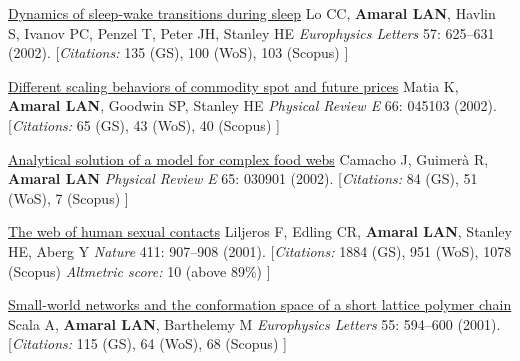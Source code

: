 \NumberedItem{\makebox[0.8cm][r]{[41]}}
\href{/people/amaral/dynamics-of-sleep-wake-transitions-during-sleep}
{Dynamics of sleep-wake transitions during sleep}
\newline
Lo CC, {\textbf{Amaral LAN}}, Havlin S, Ivanov PC, Penzel T, Peter JH, Stanley HE
\newline
\textit{Europhysics Letters}
    57:
625--631 (2002).
    \newline
    \hfill [{\em{Citations:}} 135 (GS),
    100 (WoS), 103 (Scopus)
    ]
\newline
\Gap
~
\Gap

\NumberedItem{\makebox[0.8cm][r]{[40]}}
\href{/people/amaral/different-scaling-behaviors-of-commodity-spot-and-future-prices}
{Different scaling behaviors of commodity spot and future prices}
\newline
Matia K, {\textbf{Amaral LAN}}, Goodwin SP, Stanley HE
\newline
\textit{Physical Review E}
    66:
045103 (2002).
    \newline
    \hfill [{\em{Citations:}} 65 (GS),
    43 (WoS), 40 (Scopus)
    ]
\newline
\Gap
~
\Gap

\NumberedItem{\makebox[0.8cm][r]{[39]}}
\href{/people/amaral/analytical-solution-of-a-model-for-complex-food-webs}
{Analytical solution of a model for complex food webs}
\newline
Camacho J, Guimer\`a R, {\textbf{Amaral LAN}}
\newline
\textit{Physical Review E}
    65:
030901 (2002).
    \newline
    \hfill [{\em{Citations:}} 84 (GS),
    51 (WoS), 7 (Scopus)
    ]
\newline
\Gap
~
\Gap

\NumberedItem{\makebox[0.8cm][r]{[38]}}
\href{/people/amaral/the-web-of-human-sexual-contacts}
{The web of human sexual contacts}
\newline
Liljeros F, Edling CR, {\textbf{Amaral LAN}}, Stanley HE, Aberg Y
\newline
\textit{Nature}
    411:
907--908 (2001).
    \newline
    \hfill [{\em{Citations:}} 1884 (GS),
    951 (WoS), 1078 (Scopus)
        {\hspace*{1cm} \em{Altmetric score:}}  10 (above 89\%)
    ]
\newline
\Gap
~
\Gap

\NumberedItem{\makebox[0.8cm][r]{[37]}}
\href{/people/amaral/small-world-networks-and-the-conformation-space-of-a-short-lattice-polymer-chain}
{Small-world networks and the conformation space of a short lattice polymer chain}
\newline
Scala A, {\textbf{Amaral LAN}}, Barthelemy M
\newline
\textit{Europhysics Letters}
    55:
594--600 (2001).
    \newline
    \hfill [{\em{Citations:}} 115 (GS),
    64 (WoS), 68 (Scopus)
    ]
\newline
\Gap
~
\Gap

